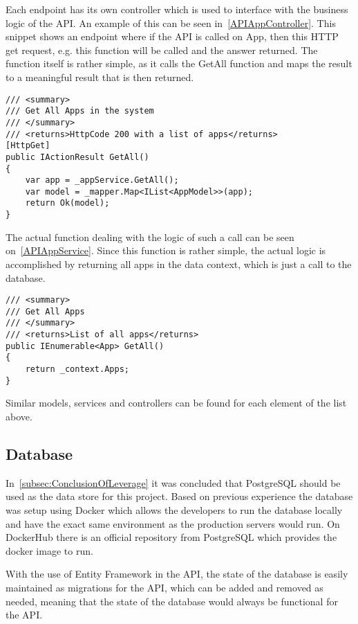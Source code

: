 Each endpoint has its own controller which is used to interface with the business logic of the API.
An example of this can be seen in~\autoref{APIAppController}.
This snippet shows an endpoint where if the API is called on App, then this HTTP get request, e.g. this function will be called and the answer returned.
The function itself is rather simple, as it calls the GetAll function and maps the result to a meaningful result that is then returned.

\begin{lstlisting}[caption={API App Controller GetAll Function}, label={APIAppController}, language={CSharp}]
/// <summary>
/// Get All Apps in the system
/// </summary>
/// <returns>HttpCode 200 with a list of apps</returns>
[HttpGet]
public IActionResult GetAll()
{
    var app = _appService.GetAll();
    var model = _mapper.Map<IList<AppModel>>(app);
    return Ok(model);
}
\end{lstlisting}

The actual function dealing with the logic of such a call can be seen on~\autoref{APIAppService}.
Since this function is rather simple, the actual logic is accomplished by returning all apps in the data context, which is just a call to the database.

\begin{lstlisting}[caption={API App Controller GetAll Function}, label={APIAppService}, language={CSharp}]
/// <summary>
/// Get All Apps
/// </summary>
/// <returns>List of all apps</returns>
public IEnumerable<App> GetAll()
{
    return _context.Apps;
}
\end{lstlisting}

Similar models, services and controllers can be found for each element of the list above.

\subsection{Database}
In~\autoref{subsec:ConclusionOfLeverage} it was concluded that PostgreSQL should be used as the data store for this project.
Based on previous experience the database was setup using Docker which allows the developers to run the database locally and have the exact same environment as the production servers would run.
On DockerHub there is an official repository from PostgreSQL which provides the docker image to run\cite{DockerHubPostgreSQL}.

With the use of Entity Framework in the API, the state of the database is easily maintained as migrations for the API, which can be added and removed as needed, meaning that the state of the database would always be functional for the API\cite{EntityFramework}.

